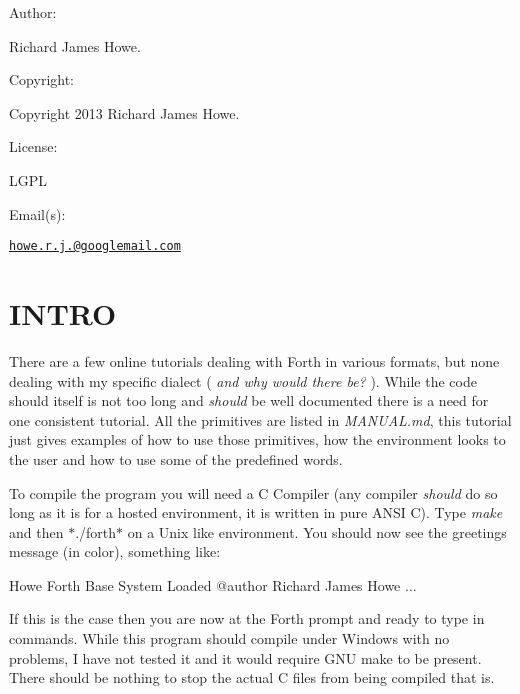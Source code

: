 

Author\-:


\begin{DoxyItemize}
\item Richard James Howe.
\end{DoxyItemize}

Copyright\-:


\begin{DoxyItemize}
\item Copyright 2013 Richard James Howe.
\end{DoxyItemize}

License\-:


\begin{DoxyItemize}
\item L\-G\-P\-L
\end{DoxyItemize}

Email(s)\-:


\begin{DoxyItemize}
\item \href{mailto:howe.r.j.89@googlemail.com}{\tt howe.\-r.\-j.@googlemail.\-com}
\end{DoxyItemize}

\section*{I\-N\-T\-R\-O}

There are a few online tutorials dealing with Forth in various formats, but none dealing with my specific dialect ( {\itshape and why would there be?} ). While the code should itself is not too long and {\itshape should} be well documented there is a need for one consistent tutorial. All the primitives are listed in {\itshape M\-A\-N\-U\-A\-L.\-md}, this tutorial just gives examples of how to use those primitives, how the environment looks to the user and how to use some of the predefined words.

To compile the program you will need a C Compiler (any compiler {\itshape should} do so long as it is for a hosted environment, it is written in pure A\-N\-S\-I C). Type {\itshape make} and then $\ast$./forth$\ast$ on a Unix like environment. You should now see the greetings message (in color), something like\-:

\begin{DoxyVerb}    Howe Forth
    Base System Loaded
    @author   Richard James Howe
    ...\end{DoxyVerb}


If this is the case then you are now at the Forth prompt and ready to type in commands. While this program should compile under Windows with no problems, I have not tested it and it would require G\-N\-U make to be present. There should be nothing to stop the actual C files from being compiled that is.

